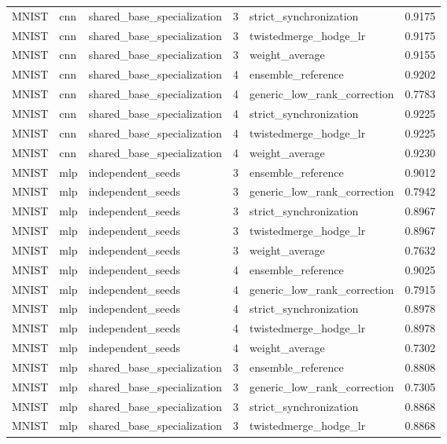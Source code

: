 \begin{table}[t]
\begin{tabular}{llllll}
MNIST & cnn & shared\_base\_specialization & 3 & strict\_synchronization & 0.9175 \\
MNIST & cnn & shared\_base\_specialization & 3 & twistedmerge\_hodge\_lr & 0.9175 \\
MNIST & cnn & shared\_base\_specialization & 3 & weight\_average & 0.9155 \\
MNIST & cnn & shared\_base\_specialization & 4 & ensemble\_reference & 0.9202 \\
MNIST & cnn & shared\_base\_specialization & 4 & generic\_low\_rank\_correction & 0.7783 \\
MNIST & cnn & shared\_base\_specialization & 4 & strict\_synchronization & 0.9225 \\
MNIST & cnn & shared\_base\_specialization & 4 & twistedmerge\_hodge\_lr & 0.9225 \\
MNIST & cnn & shared\_base\_specialization & 4 & weight\_average & 0.9230 \\
MNIST & mlp & independent\_seeds & 3 & ensemble\_reference & 0.9012 \\
MNIST & mlp & independent\_seeds & 3 & generic\_low\_rank\_correction & 0.7942 \\
MNIST & mlp & independent\_seeds & 3 & strict\_synchronization & 0.8967 \\
MNIST & mlp & independent\_seeds & 3 & twistedmerge\_hodge\_lr & 0.8967 \\
MNIST & mlp & independent\_seeds & 3 & weight\_average & 0.7632 \\
MNIST & mlp & independent\_seeds & 4 & ensemble\_reference & 0.9025 \\
MNIST & mlp & independent\_seeds & 4 & generic\_low\_rank\_correction & 0.7915 \\
MNIST & mlp & independent\_seeds & 4 & strict\_synchronization & 0.8978 \\
MNIST & mlp & independent\_seeds & 4 & twistedmerge\_hodge\_lr & 0.8978 \\
MNIST & mlp & independent\_seeds & 4 & weight\_average & 0.7302 \\
MNIST & mlp & shared\_base\_specialization & 3 & ensemble\_reference & 0.8808 \\
MNIST & mlp & shared\_base\_specialization & 3 & generic\_low\_rank\_correction & 0.7305 \\
MNIST & mlp & shared\_base\_specialization & 3 & strict\_synchronization & 0.8868 \\
MNIST & mlp & shared\_base\_specialization & 3 & twistedmerge\_hodge\_lr & 0.8868 \\

\end{tabular}
\end{table}

